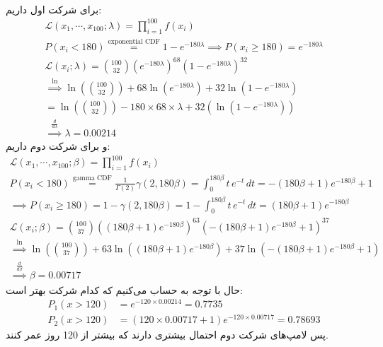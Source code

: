 \\
برای شرکت اول داریم:
\begin{gather*}
    \mathcal{L}(x_1,\cdots ,x_{100};\lambda) = \prod_{i=1}^{100} f(x_i)\\
    P(x_i < 180) \stackrel{\text{exponential CDF}}{=} 1 - e^{-180\lambda} \implies P(x_i \ge 180) = e^{-180\lambda}\\
    \mathcal{L}(x_i;\lambda) = {100 \choose 32} ( e^{-180\lambda})^{68} (1 - e^{-180\lambda})^{32}\\
    \stackrel{\ln}{\implies} \ln({100 \choose 32}) + 68 \ln( e^{-180\lambda}) + 32 \ln(1 - e^{-180\lambda})\\
    = \ln({100 \choose 32}) - 180 \times 68 \times \lambda + 32 (\ln(1 - e^{-180\lambda}))\\
    \stackrel{\frac{d}{d\lambda}}{\implies} \lambda = 0.00214
\end{gather*}
و برای شرکت دوم داریم:
\begin{gather*}
    \mathcal{L}(x_1,\cdots ,x_{100};\beta) = \prod_{i=1}^{100} f(x_i)\\
    P(x_i < 180) \stackrel{\text{gamma CDF}}{=} \frac{1}{\Gamma(2)} \gamma(2, 180 \beta) = \int_0^{180 \beta} t\,e^{-t}\, dt = -(180 \beta + 1) e^{-180 \beta} + 1\\
    \implies P(x_i \ge 180) = 1 - \gamma(2, 180 \beta) = 1 - \int_0^{180 \beta} t\,e^{-t}\, dt = (180 \beta + 1) e^{-180 \beta}\\
    \mathcal{L}(x_i;\beta) = {100 \choose 37} ( (180 \beta + 1) e^{-180 \beta} )^{63} (-(180 \beta + 1) e^{-180 \beta} + 1)^{37}\\
    \stackrel{\ln}{\implies} \ln({100 \choose 37}) + 63 \ln( (180 \beta + 1) e^{-180 \beta}) + 37 \ln(-(180 \beta + 1) e^{-180 \beta} + 1)\\
    \stackrel{\frac{d}{d\beta}}{\implies} \beta = 0.00717
\end{gather*}
حال با توجه به
حساب می‌کنیم که کدام شرکت بهتر است:
\begin{align*}
    P_1(x > 120) &= e^{-120 \times 0.00214} = 0.7735\\
    P_2(x > 120) &= (120 \times 0.00717 + 1) e^{-120 \times 0.00717} = 0.78693
\end{align*}
پس لامپ‌های شرکت دوم احتمال بیشتری دارند که بیشتر از 120 روز عمر کنند.




